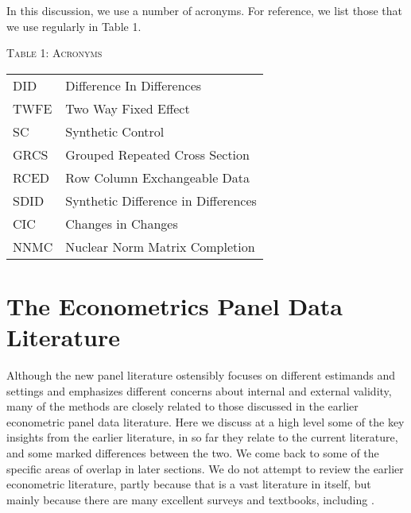 \documentclass[letterpaper,12pt,leqno]{article}
\begin{document}
In this discussion, we use a number of acronyms. For reference, we list those that we use regularly in Table 1.
\begin{table}\label{tabel1}
\begin{centering}\textsc{Table 1: Acronyms}
\par\end{centering}
\centering{}\label{tabel_classification}\vskip0.3cm \centering{}%
\begin{tabular}{ll}
 \tabularnewline
\hline 
DID & Difference In Differences\\
TWFE & Two Way Fixed Effect\\
SC & Synthetic Control\\
GRCS & Grouped Repeated Cross Section\\
RCED & Row Column Exchangeable  Data \\
SDID & Synthetic Difference in Differences\\
CIC & Changes in Changes\\
NNMC & Nuclear Norm Matrix Completion
\tabularnewline
\end{tabular}
\end{table}


\section{The Econometrics Panel Data Literature}\label{section:traditional}

Although the new panel literature ostensibly focuses on different estimands and settings and emphasizes different concerns about internal and external validity, many of the methods are closely related to those discussed in the earlier econometric panel data literature. Here we discuss at a high level some of the key insights from the earlier literature, in so far they relate to the current literature,  and some marked differences between the two. We come back to some of the specific areas of overlap in later sections. We do not attempt to review the earlier econometric literature, partly because that is a vast literature in itself, but mainly because there are many excellent surveys and textbooks, including \citep{arellano2001panel, arellano2003panel,baltagi2008econometric,hsiao2022analysis, wooldridge2010econometric,arellano2011nonlinear}.
\end{document}
